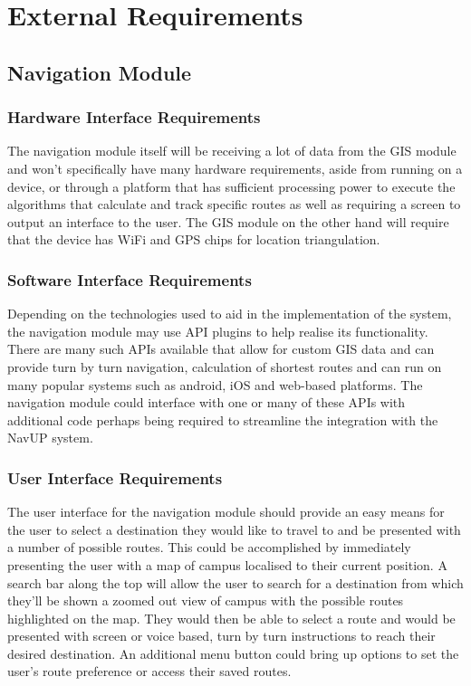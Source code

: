 \documentclass[11pt]{article}
\begin{document}
\section{External Requirements}

\subsection{Navigation Module}
\subsubsection{Hardware Interface Requirements}
  
The navigation module itself will be receiving a lot of data from the GIS module and won’t specifically have many hardware requirements,  aside from running on a device, or through a platform that has sufficient processing power to execute the algorithms that calculate and track specific routes as well as requiring a screen to output an interface to the user. The GIS module on the other hand will require that the device has WiFi and GPS chips for location triangulation.
  
 \subsubsection{Software Interface Requirements}
  
Depending on the technologies used to aid in the implementation of the system, the navigation module may use API plugins to help realise its functionality. There are many such APIs available that allow for custom GIS data and can provide turn by turn navigation, calculation of shortest routes and can run on many popular systems such as android, iOS and web-based platforms. The navigation module could interface with one or many of these APIs with additional code perhaps being required to streamline the integration with the NavUP system.
  
 \subsubsection{User Interface Requirements}
  
The user interface for the navigation module should provide an easy means for the user to select a destination they would like to travel to and be presented with a number of possible routes. This could be accomplished by immediately presenting the user with a map of campus localised to their current position. A search bar along the top will allow the user to search for a destination from which they’ll be shown a zoomed out view of campus with the possible routes highlighted on the map. They would then be able to select a route and would be presented with screen or voice based, turn by turn instructions to reach their desired destination. An additional menu button could bring up options to set the user’s route preference or access their saved routes.
  
\end{document}
